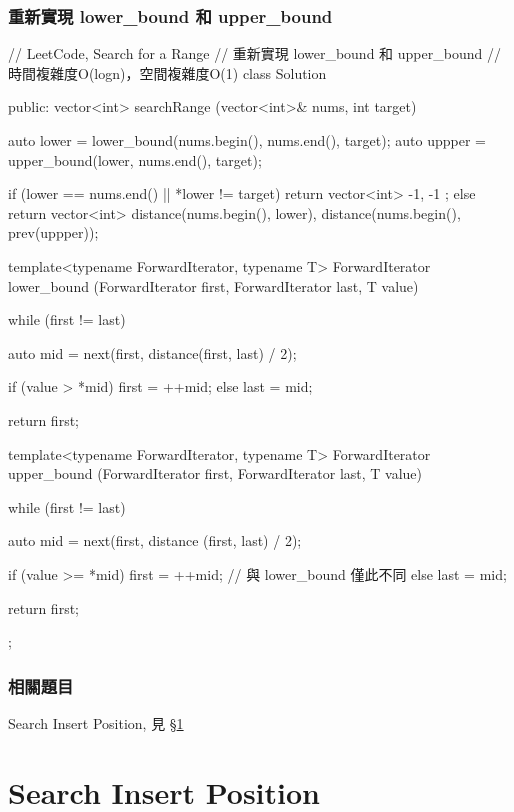 \subsubsection{重新實現 lower_bound 和 upper_bound}
\begin{Code}
// LeetCode, Search for a Range
// 重新實現 lower_bound 和 upper_bound
// 時間複雜度O(logn)，空間複雜度O(1)
class Solution {
public:
    vector<int> searchRange (vector<int>& nums, int target) {
        auto lower = lower_bound(nums.begin(), nums.end(), target);
        auto uppper = upper_bound(lower, nums.end(), target);

        if (lower == nums.end() || *lower != target)
            return vector<int> { -1, -1 };
        else
            return vector<int> {distance(nums.begin(), lower),
                                distance(nums.begin(), prev(uppper))};
    }

    template<typename ForwardIterator, typename T>
    ForwardIterator lower_bound (ForwardIterator first,
            ForwardIterator last, T value) {
        while (first != last) {
            auto mid = next(first, distance(first, last) / 2);

            if (value > *mid)   first = ++mid;
            else                last = mid;
        }

        return first;
    }

    template<typename ForwardIterator, typename T>
    ForwardIterator upper_bound (ForwardIterator first,
            ForwardIterator last, T value) {
        while (first != last) {
            auto mid = next(first, distance (first, last) / 2);

            if (value >= *mid)   first = ++mid;  // 與 lower_bound 僅此不同
            else                 last = mid;
        }

        return first;
    }
};
\end{Code}

\subsubsection{相關題目}
\begindot
\item Search Insert Position, 見 \S \ref{sec:search-insert-position}
\myenddot


\section{Search Insert Position} %
\label{sec:search-insert-position}



